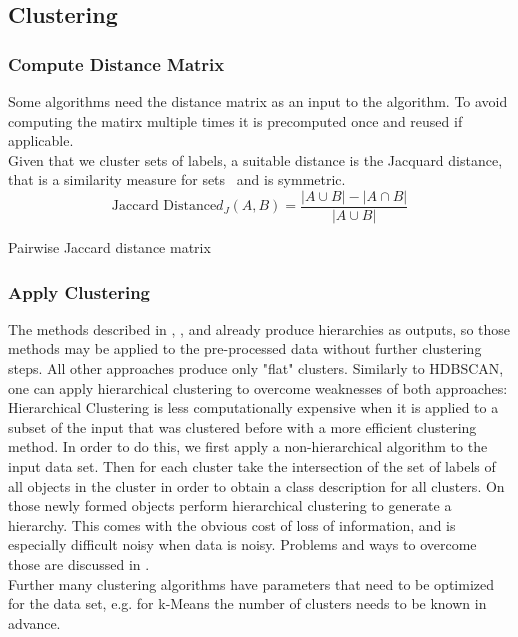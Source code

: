 \subsection{Clustering}\label{\positionnumber}
\subsubsection{Compute Distance Matrix}\label{\positionnumber}
Some algorithms need the distance matrix as an input to the algorithm. To avoid computing the matirx multiple times it is precomputed once and reused if applicable. \\
Given that we cluster sets of labels, a suitable distance is the Jacquard distance, that is a similarity measure for sets~\cite{DBLP:journals/corr/Kosub16} and is symmetric. \\
\[\text{Jaccard Distance} d_J(A, B) = \frac{|A \cup B| - |A \cap B|}{|A \cup B|} \]
\begin{algorithm}[htp]
\caption{Pairwise Jaccard distance matrix}\label{distM}
\end{algorithm}

\subsubsection{Apply Clustering}\label{\positionnumber}
The methods described in , ,  and  already produce hierarchies as outputs, so those methods may be applied to the pre-processed data without further clustering steps. All other approaches produce only "flat" clusters. Similarly to HDBSCAN, one can apply hierarchical clustering to overcome weaknesses of both approaches: Hierarchical Clustering is less computationally expensive when it is applied to a subset of the input that was clustered before with a more efficient clustering method. In order to do this, we first apply a non-hierarchical algorithm to the input data set. Then for each cluster take the intersection of the set of labels of all objects in the cluster in order to obtain a class description for all clusters. On those newly formed objects perform hierarchical clustering to generate a hierarchy. This comes with the obvious cost of loss of information, and is especially difficult noisy when data is noisy. Problems and ways to overcome those are discussed in . \\
Further many clustering algorithms have parameters that need to be optimized for the data set, e.g. for k-Means the number of clusters needs to be known in advance.


